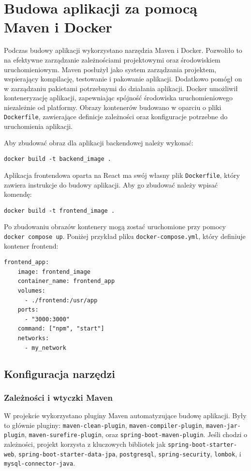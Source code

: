 \section{Budowa aplikacji za pomocą Maven i Docker}
Podczas budowy aplikacji wykorzystano narzędzia Maven i Docker. Pozwoliło to na efektywne zarządzanie  zależnościami projektowymi oraz środowiskiem uruchomieniowym. Maven posłużył jako system zarządzania projektem, wspierający kompilację, testowanie i pakowanie aplikacji. Dodatkowo pomógł on w zarządzaniu pakietami potrzebnymi do działania aplikacji. Docker umożliwił konteneryzację aplikacji, zapewniając spójność środowiska uruchomieniowego niezależnie od platformy. Obrazy kontenerów budowano w oparciu o pliki \texttt{Dockerfile}, zawierające definicje zależności oraz konfiguracje potrzebne do uruchomienia aplikacji. 

Aby zbudować obraz dla aplikacji backendowej należy wykonać:
\begin{lstlisting}[basicstyle=\footnotesize\ttfamily]
docker build -t backend_image .
\end{lstlisting}

Aplikacja frontendowa oparta na React ma swój własny plik \texttt{Dockerfile}, który zawiera instrukcje do budowy aplikacji. Aby go zbudować należy wpisać komendę:
\begin{lstlisting}[basicstyle=\footnotesize\ttfamily]
docker build -t frontend_image .
\end{lstlisting}


Po zbudowaniu obrazów kontenery mogą zostać uruchomione przy pomocy \texttt{docker compose up}. Poniżej przykład pliku \texttt{docker-compose.yml}, który definiuje kontener frontend:
\begin{lstlisting}[basicstyle=\footnotesize\ttfamily]
  frontend_app:
    image: frontend_image
    container_name: frontend_app
    volumes:
      - ./frontend:/usr/app
    ports:
      - "3000:3000"
    command: ["npm", "start"]
    networks:
      - my_network
\end{lstlisting}

\subsection{Konfiguracja narzędzi} 

\subsubsection{Zależności i wtyczki Maven}
W projekcie wykorzystano pluginy Maven automatyzujące budowę aplikacji. Były to głównie pluginy: \texttt{maven-clean-plugin}, \texttt{maven-compiler-plugin}, \texttt{maven-jar-plugin}, \texttt{maven-surefire-plugin}, oraz \texttt{spring-boot-maven-plugin}.
Jeśli chodzi o zależności, projekt korzysta z kluczowych bibliotek jak \texttt{spring-boot-starter-web}, \texttt{spring-boot-starter-data-jpa}, \texttt{postgresql}, \texttt{spring-security}, \texttt{lombok}, i \texttt{mysql-connector-java}.

